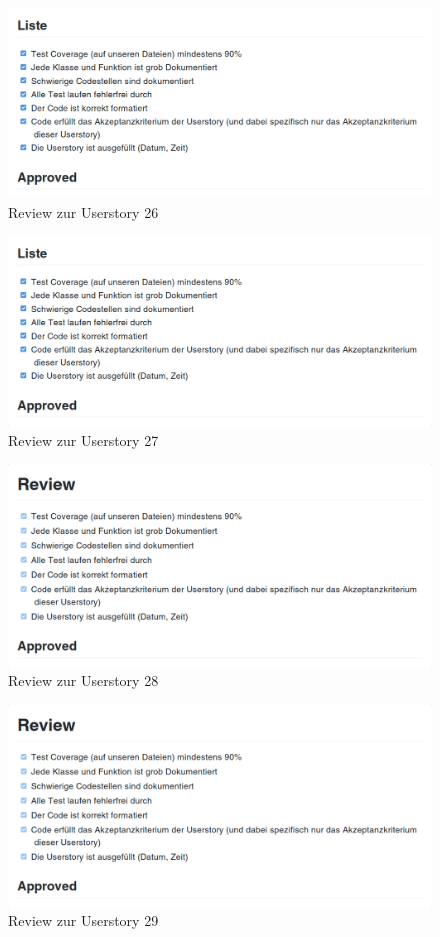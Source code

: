 \documentclass[accentcolor=tud9c,12pt,paper=a4]{tudreport}
\begin{document}
\begin{figure}[H]
\centering
\includegraphics[width=.8\textwidth]{code_review/us26}
\caption{Review zur Userstory 26}
\end{figure}

\begin{figure}[H]
\centering
\includegraphics[width=.8\textwidth]{code_review/us27}
\caption{Review zur Userstory 27}
\end{figure}

\begin{figure}[H]
\centering
\includegraphics[width=.8\textwidth]{code_review/us28}
\caption{Review zur Userstory 28}
\end{figure}

\begin{figure}[H]
\centering
\includegraphics[width=.8\textwidth]{code_review/us29}
\caption{Review zur Userstory 29}
\end{figure}
\end{document}
